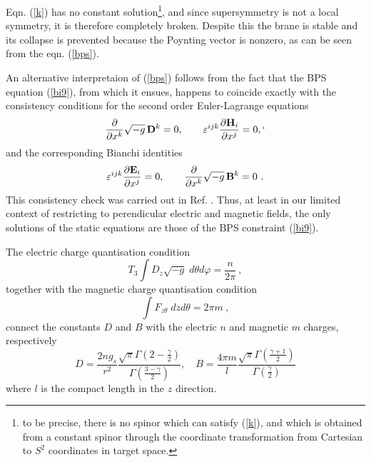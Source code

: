 \documentclass[a4paper,12pt]{article}
\begin{document}
Eqn. (\ref{k}) has no constant solution\footnote[1]{to be precise, there is no spinor which can satisfy (\ref{k}), and which is obtained from a constant spinor through the coordinate transformation from Cartesian to $S^2$ coordinates in target space.}, and since supersymmetry is not a local symmetry, it is therefore completely broken. Despite this the brane is stable and its collapse is prevented because the Poynting vector is nonzero, as can be seen from the eqn. (\ref{bps}).

An alternative interpretaion of (\ref{bps}) follows from the fact that the BPS equation (\ref{bi9}), from which it ensues, happens to coincide exactly with the consistency conditions for the second order Euler-Lagrange equations
\begin{equation}
\frac{\partial }{\partial x^k}\sqrt{-g}\,{{\bf D}}^k=0,\qquad 
{\varepsilon}^{ijk}\frac{\partial {{\bf H}}_i}{\partial x^j}=0,
\label{s2}`
\end{equation}
and the corresponding Bianchi identities
\begin{equation}
{\varepsilon}^{ijk}\frac{\partial {{\bf E}}_i}{\partial x^j}=0,\qquad 
\frac{\partial }{\partial x^k}\sqrt{-g}\,{{\bf B}}^k=0\ .
\label{s3}
\end{equation}
This consistency check was carried out in Ref. \cite{dual}.
Thus, at least in our limited context of restricting to perendicular electric and magnetic fields, the only solutions of the static equations are those of the BPS constraint (\ref{bi9}).
 
The electric charge quantisation condition
\begin{equation}
T_3\int D_z\sqrt{-g}\;d\theta d\varphi =\frac{n}{2\pi}\ ,
\label{ec}
\end{equation}
together with the magnetic charge quantisation condition
\begin{equation}
\int F_{z\theta}\;dzd\theta =2\pi m\ ,
\label{mc}
\end{equation}
connect the constants $D$ and $B$ with the electric $n$ and magnetic $m$ charges, respectively
\begin{equation}
D=\frac{2ng_s}{r^2}
\frac{\sqrt{\pi}\Gamma (2-\frac{\gamma}{2})}
{\Gamma (\frac{3-\gamma}{2})},\quad 
B=\frac{4\pi m}{l}
\frac{\sqrt{\pi}\Gamma (\frac{\gamma +1}{2})}{\Gamma (\frac{\gamma}{2})}
\label{emg}
\end{equation}
where $l$ is the compact length in the $z$ direction.
\end{document}

